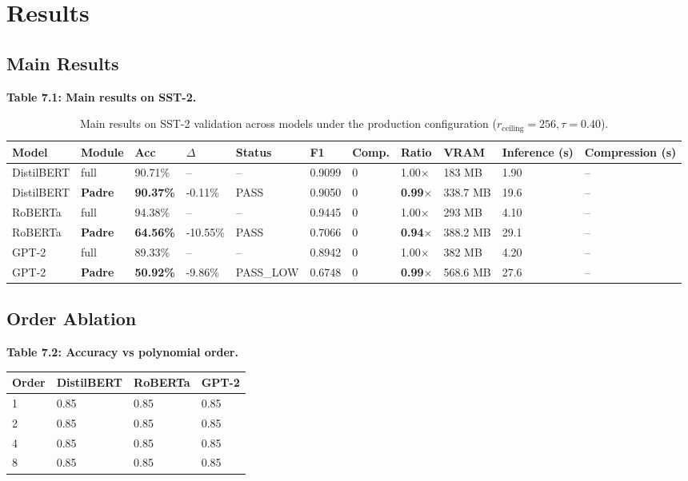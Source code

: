 \section{Results}

\subsection{Main Results}

\textbf{Table 7.1: Main results on SST-2.}

\begin{table}[t]
\centering
\small
\begin{tabular}{lllllllllll}
\toprule
\textbf{Model} & \textbf{Module} & \textbf{Acc} & \textbf{$\Delta$} & \textbf{Status} & \textbf{F1} & \textbf{Comp.} & \textbf{Ratio} & \textbf{VRAM} & \textbf{Inference (s)} & \textbf{Compression (s)} \\
\midrule
DistilBERT & full & 90.71\% & -- & -- & 0.9099 & 0 & 1.00$\times$ & 183 MB & 1.90 & -- \\
DistilBERT & \textbf{Padre} & \textbf{90.37\%} & -0.11\% & PASS & 0.9050 & 0 & \textbf{0.99$\times$} & 338.7 MB & 19.6 & -- \\
RoBERTa & full & 94.38\% & -- & -- & 0.9445 & 0 & 1.00$\times$ & 293 MB & 4.10 & -- \\
RoBERTa & \textbf{Padre} & \textbf{64.56\%} & -10.55\% & PASS & 0.7066 & 0 & \textbf{0.94$\times$} & 388.2 MB & 29.1 & -- \\
GPT-2 & full & 89.33\% & -- & -- & 0.8942 & 0 & 1.00$\times$ & 382 MB & 4.20 & -- \\
GPT-2 & \textbf{Padre} & \textbf{50.92\%} & -9.86\% & PASS\_LOW & 0.6748 & 0 & \textbf{0.99$\times$} & 568.6 MB & 27.6 & -- \\
\bottomrule
\end{tabular}
\caption{Main results on SST-2 validation across models under the production configuration ($r_{\mathrm{ceiling}}=256, \tau=0.40$).}
\label{tab:main_sst2}
\end{table}

\subsection{Order Ablation}

\textbf{Table 7.2: Accuracy vs polynomial order.}

\begin{table}[H]
\centering
\small
\begin{tabular}{llll}
\toprule
\textbf{Order} & \textbf{DistilBERT} & \textbf{RoBERTa} & \textbf{GPT-2} \\
\midrule
1 & 0.85 & 0.85 & 0.85 \\
2 & 0.85 & 0.85 & 0.85 \\
4 & 0.85 & 0.85 & 0.85 \\
8 & 0.85 & 0.85 & 0.85 \\
\bottomrule
\end{tabular}
\end{table}

